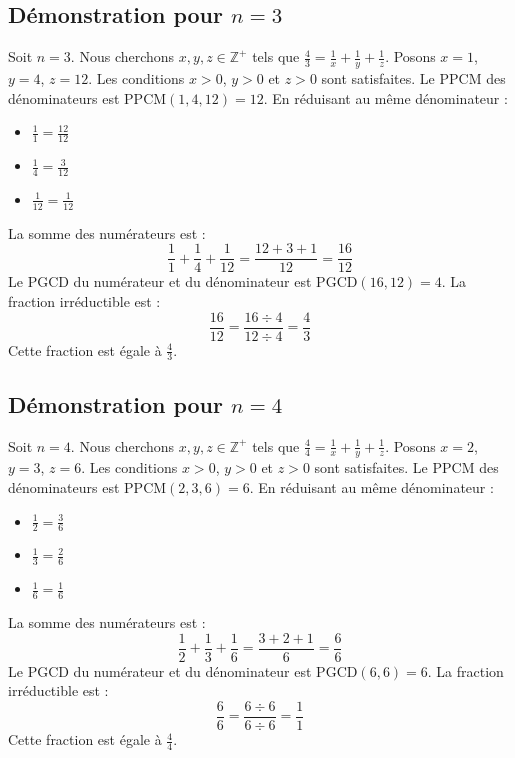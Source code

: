\documentclass[11pt,a4paper]{article}
\begin{document}
\subsection{Démonstration pour $n = 3$}
Soit $n = 3$. Nous cherchons $x, y, z \in \mathbb{Z}^{+}$ tels que $\frac{4}{3} = \frac{1}{x} + \frac{1}{y} + \frac{1}{z}$.
Posons $x = 1$, $y = 4$, $z = 12$.
Les conditions $x > 0$, $y > 0$ et $z > 0$ sont satisfaites.
Le PPCM des dénominateurs est $\text{PPCM}(1, 4, 12) = 12$.
En réduisant au même dénominateur :
\begin{itemize}
    \item $\frac{1}{1} = \frac{12}{12}$
    \item $\frac{1}{4} = \frac{3}{12}$
    \item $\frac{1}{12} = \frac{1}{12}$
\end{itemize}
La somme des numérateurs est :
$$ \frac{1}{1} + \frac{1}{4} + \frac{1}{12} = \frac{12 + 3 + 1}{12} = \frac{16}{12} $$
Le PGCD du numérateur et du dénominateur est $\text{PGCD}(16, 12) = 4$.
La fraction irréductible est :
$$ \frac{16}{12} = \frac{16 \div 4}{12 \div 4} = \frac{4}{3} $$
Cette fraction est égale à $\frac{4}{3}$.

\subsection{Démonstration pour $n = 4$}
Soit $n = 4$. Nous cherchons $x, y, z \in \mathbb{Z}^{+}$ tels que $\frac{4}{4} = \frac{1}{x} + \frac{1}{y} + \frac{1}{z}$.
Posons $x = 2$, $y = 3$, $z = 6$.
Les conditions $x > 0$, $y > 0$ et $z > 0$ sont satisfaites.
Le PPCM des dénominateurs est $\text{PPCM}(2, 3, 6) = 6$.
En réduisant au même dénominateur :
\begin{itemize}
    \item $\frac{1}{2} = \frac{3}{6}$
    \item $\frac{1}{3} = \frac{2}{6}$
    \item $\frac{1}{6} = \frac{1}{6}$
\end{itemize}
La somme des numérateurs est :
$$ \frac{1}{2} + \frac{1}{3} + \frac{1}{6} = \frac{3 + 2 + 1}{6} = \frac{6}{6} $$
Le PGCD du numérateur et du dénominateur est $\text{PGCD}(6, 6) = 6$.
La fraction irréductible est :
$$ \frac{6}{6} = \frac{6 \div 6}{6 \div 6} = \frac{1}{1} $$
Cette fraction est égale à $\frac{4}{4}$.
\end{document}
